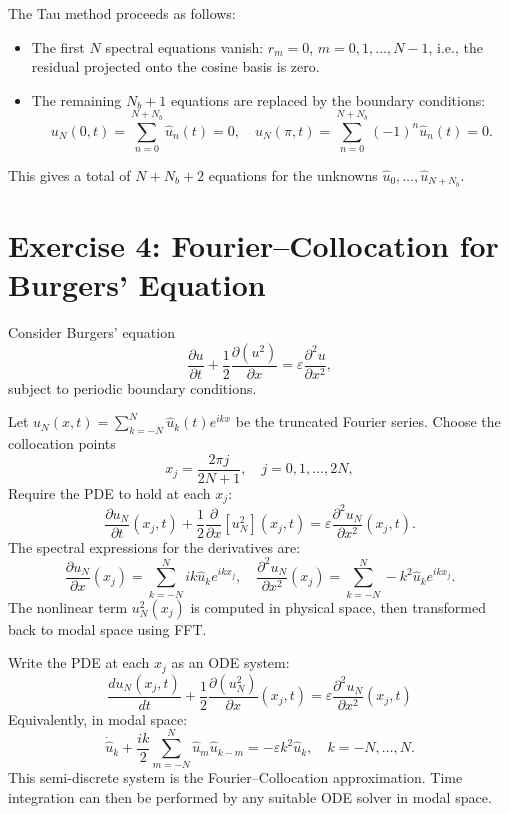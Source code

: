 \documentclass[11pt]{article}
\begin{document}
The Tau method proceeds as follows:
\begin{itemize}
  \item The first $N$ spectral equations vanish: $r_m=0$, $m=0,1,\dots,N-1$, i.e., the residual projected onto the cosine basis is zero.
  \item The remaining $N_b+1$ equations are replaced by the boundary conditions:
  \[
    u_N(0,t)=\sum_{n=0}^{N+N_b}\hat u_n(t)=0,\quad
    u_N(\pi,t)=\sum_{n=0}^{N+N_b}(-1)^n\hat u_n(t)=0.
  \]
\end{itemize}
This gives a total of $N+N_b+2$ equations for the unknowns $\hat u_0,\dots,\hat u_{N+N_b}$.


\section*{Exercise 4: Fourier--Collocation for Burgers' Equation}
Consider Burgers' equation
\begin{equation}
\frac{\partial u}{\partial t} + \frac{1}{2} \frac{\partial (u^2)}{\partial x} = \varepsilon \frac{\partial^2 u}{\partial x^2},
\end{equation}
subject to periodic boundary conditions.

Let $u_N(x,t)=\sum_{k=-N}^N \hat u_k(t)e^{ikx}$ be the truncated Fourier series.  Choose the collocation points
\[
 x_j = \frac{2\pi j}{2N+1},\quad j=0,1,\dots,2N,
\]
Require the PDE to hold at each $x_j$:
\[
 \frac{\partial u_N}{\partial t}(x_j,t)
 + \frac{1}{2}\frac{\partial}{\partial x}[u_N^2](x_j,t)
 = \varepsilon \frac{\partial^2 u_N}{\partial x^2}(x_j,t).
\]
The spectral expressions for the derivatives are:
\[
 \frac{\partial u_N}{\partial x}(x_j) = \sum_{k=-N}^N ik\hat u_k e^{ikx_j},
 \quad
 \frac{\partial^2 u_N}{\partial x^2}(x_j) = \sum_{k=-N}^N -k^2\hat u_k e^{ikx_j}.
\]
The nonlinear term $u_N^2(x_j)$ is computed in physical space, then transformed back to modal space using FFT.

Write the PDE at each $x_j$ as an ODE system:
\[
 \frac{d u_N(x_j, t)}{dt} + \frac{1}{2} \frac{\partial (u_N^2)}{\partial x}(x_j, t) = \varepsilon \frac{\partial^2 u_N}{\partial x^2}(x_j, t)
\]
Equivalently, in modal space:
\[
 \dot{\hat u}_k + \frac{ik}{2}\sum_{m=-N}^N \hat u_m\hat u_{k-m}
 = -\varepsilon k^2 \hat u_k,
 \quad k=-N,\dots,N.
\]
This semi-discrete system is the Fourier–Collocation approximation. Time integration can then be performed by any suitable ODE solver in modal space.
\end{document}
